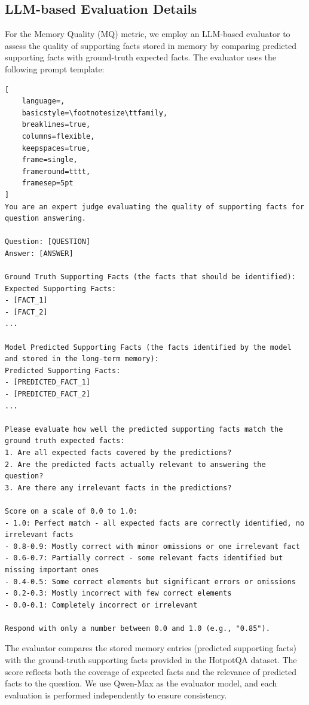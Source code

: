 \subsection{LLM-based Evaluation Details}
\label{app:evaluation}

For the Memory Quality (MQ) metric, we employ an LLM-based evaluator to assess the quality of supporting facts stored in memory by comparing predicted supporting facts with ground-truth expected facts. The evaluator uses the following prompt template:

\begin{lstlisting}[
    language=,
    basicstyle=\footnotesize\ttfamily,
    breaklines=true,
    columns=flexible,
    keepspaces=true,
    frame=single,
    frameround=tttt,
    framesep=5pt
]
You are an expert judge evaluating the quality of supporting facts for question answering.

Question: [QUESTION]
Answer: [ANSWER]

Ground Truth Supporting Facts (the facts that should be identified):
Expected Supporting Facts:
- [FACT_1]
- [FACT_2]
...

Model Predicted Supporting Facts (the facts identified by the model and stored in the long-term memory):
Predicted Supporting Facts:
- [PREDICTED_FACT_1]
- [PREDICTED_FACT_2]
...

Please evaluate how well the predicted supporting facts match the ground truth expected facts:
1. Are all expected facts covered by the predictions?
2. Are the predicted facts actually relevant to answering the question?
3. Are there any irrelevant facts in the predictions?

Score on a scale of 0.0 to 1.0:
- 1.0: Perfect match - all expected facts are correctly identified, no irrelevant facts
- 0.8-0.9: Mostly correct with minor omissions or one irrelevant fact
- 0.6-0.7: Partially correct - some relevant facts identified but missing important ones
- 0.4-0.5: Some correct elements but significant errors or omissions
- 0.2-0.3: Mostly incorrect with few correct elements
- 0.0-0.1: Completely incorrect or irrelevant

Respond with only a number between 0.0 and 1.0 (e.g., "0.85").
\end{lstlisting}
The evaluator compares the stored memory entries (predicted supporting facts) with the ground-truth supporting facts provided in the HotpotQA dataset. The score reflects both the coverage of expected facts and the relevance of predicted facts to the question. We use Qwen-Max as the evaluator model, and each evaluation is performed independently to ensure consistency.

